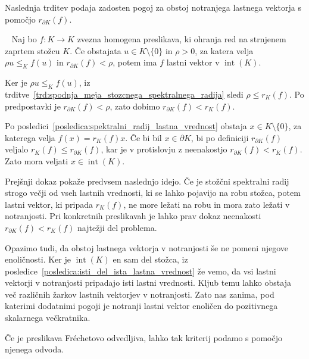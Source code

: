 \documentclass[mat2, tisk]{fmfdelo}
\begin{document}
Naslednja trditev podaja zadosten pogoj za obstoj
notranjega lastnega vektorja s pomočjo
$r_{\partial K}(f)$.

\begin{trditev}~\label{trd:obstoj_lastnega_vektorja_v_notranjosti}
  Naj bo $f:K\longrightarrow K$ zvezna homogena preslikava, ki ohranja
  red na strnjenem zaprtem stožcu $K$. Če obstajata
  $u\in K\setminus\{0\}$ in $\rho>0$, za katera velja
  $\rho u\leq_K f(u)$ in
  $r_{\partial K}(f)<\rho$, potem ima $f$ lastni vektor v
  $\operatorname{int}(K)$.
\end{trditev}

\begin{dokaz}
  Ker je $\rho u\leq_K f(u)$, iz
  trditve~\ref{trd:spodnja_meja_stozcnega_spektralnega_radija} sledi
  $\rho\leq r_K(f)$. Po predpostavki je
  $r_{\partial K}(f)<\rho$, zato dobimo
  $r_{\partial K}(f)<r_K(f)$.

  Po posledici~\ref{posledica:spektralni_radij_lastna_vrednost}
  obstaja $x\in K\setminus\{0\}$, za katerega velja
  $f(x)=r_K(f)x$. Če bi bil $x\in\partial K$, bi po definiciji
  $r_{\partial K}(f)$ veljalo $r_K(f)\leq r_{\partial K}(f)$, kar je v
  protislovju z neenakostjo
  $r_{\partial K}(f)<r_K(f)$. Zato mora veljati
  $x\in\operatorname{int}(K)$.
\end{dokaz}

Prejšnji dokaz pokaže predvsem naslednjo idejo. Če je stožčni
spektralni radij strogo večji od vseh lastnih vrednosti, ki se lahko
pojavijo na robu stožca, potem lastni vektor, ki pripada
$r_K(f)$, ne more ležati na robu in mora zato ležati v notranjosti.
Pri konkretnih preslikavah je lahko prav dokaz neenakosti
$r_{\partial K}(f)<r_K(f)$ najtežji del problema.

Opazimo tudi, da obstoj lastnega vektorja v notranjosti še ne pomeni
njegove enoličnosti. Ker je $\operatorname{int}(K)$ en sam del
stožca, iz posledice~\ref{posledica:isti_del_ista_lastna_vrednost} že vemo, da
vsi lastni vektorji v notranjosti pripadajo isti lastni vrednosti.
Kljub temu lahko obstaja več različnih žarkov lastnih vektorjev v
notranjosti. Zato nas zanima, pod katerimi dodatnimi pogoji je notranji
lastni vektor enoličen do pozitivnega skalarnega večkratnika.

Če je preslikava Fréchetovo odvedljiva, lahko tak kriterij
podamo s pomočjo njenega odvoda.
\end{document}
